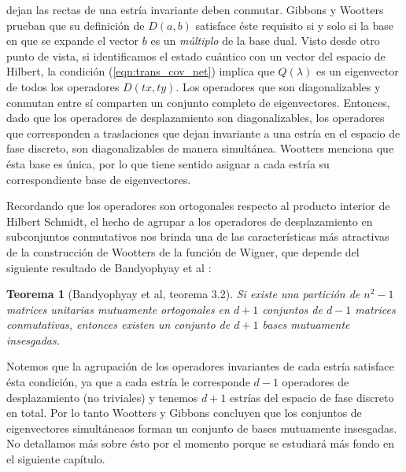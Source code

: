 \documentclass[a4paper]{report}
\newtheorem{theorem}{Teorema}
\begin{document}
  dejan las rectas de una estría invariante deben conmutar.
  Gibbons y Wootters prueban que su definición de $D(a,b)$
  satisface éste requisito si y solo si la base en que se
  expande el vector $b$ es un \textit{múltiplo} de la base
  dual. Visto desde otro punto de vista, si identificamos el
  estado cuántico con un vector del espacio de Hilbert, la
  condición (\ref{eqn:trans_cov_net}) implica que
  $Q(\lambda)$ es un eigenvector de todos los operadores
  $D(tx,ty)$. Los operadores que son diagonalizables y
  conmutan entre sí comparten un conjunto completo de
  eigenvectores. Entonces, dado que los operadores de
  desplazamiento son diagonalizables, los operadores que
  corresponden a traslaciones que dejan invariante a una
  estría en el espacio de fase discreto, son diagonalizables
  de manera simultánea. Wootters menciona que ésta base es
  única, por lo que tiene sentido asignar a cada estría su
  correspondiente base de eigenvectores.

  Recordando que los operadores son ortogonales respecto al
  producto interior de Hilbert Schmidt, el hecho de agrupar
  a los operadores de desplazamiento en subconjuntos
  conmutativos nos brinda una de las características más
  atractivas de la construcción de Wootters de la función de
  Wigner, que depende del siguiente resultado de Bandyophyay
  et al \cite{bandyopadhyay2001}:
  \begin{theorem}[Bandyophyay et al, teorema 3.2]
    Si existe una partición de $n^2-1$ matrices unitarias
    mutuamente ortogonales en $d+1$ conjuntos de $d-1$
    matrices conmutativas, entonces existen un conjunto de
    $d+1$ bases mutuamente insesgadas.
  \end{theorem}
  Notemos que la agrupación de los operadores invariantes de
  cada estría satisface ésta condición, ya que a cada estría
  le corresponde $d-1$ operadores de desplazamiento (no
  triviales) y tenemos $d+1$ estrías del espacio de fase
  discreto en total. Por lo tanto Wootters y Gibbons
  concluyen que los conjuntos de eigenvectores simultáneaos
  forman un conjunto de bases mutuamente insesgadas. No
  detallamos más sobre ésto por el momento porque se
  estudiará más fondo en el siguiente capítulo.
\end{document}
